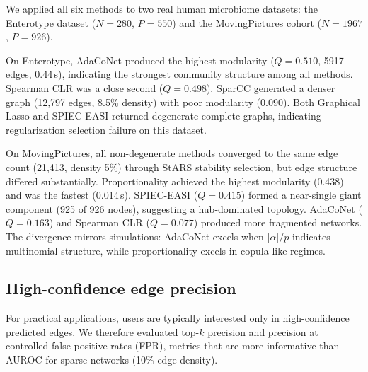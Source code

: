 \documentclass[unnumsec,webpdf,contemporary,large,numbered]{oup-authoring-template}
\theoremstyle{plain}
\theoremstyle{definition}
\begin{document}
We applied all six methods to two real human microbiome datasets: the Enterotype dataset ($N{=}280$, $P{=}550$) and the MovingPictures cohort ($N{=}1967$, $P{=}926$).

On Enterotype, AdaCoNet produced the highest modularity ($Q{=}0.510$, 5917 edges, 0.44\,s), indicating the strongest community structure among all methods. Spearman CLR was a close second ($Q{=}0.498$). SparCC generated a denser graph (12{,}797 edges, 8.5\% density) with poor modularity (0.090). Both Graphical Lasso and SPIEC-EASI returned degenerate complete graphs, indicating regularization selection failure on this dataset.

On MovingPictures, all non-degenerate methods converged to the same edge count (21{,}413, density 5\%) through StARS stability selection, but edge structure differed substantially. Proportionality achieved the highest modularity (0.438) and was the fastest (0.014\,s). SPIEC-EASI ($Q{=}0.415$) formed a near-single giant component (925 of 926 nodes), suggesting a hub-dominated topology. AdaCoNet ($Q{=}0.163$) and Spearman CLR ($Q{=}0.077$) produced more fragmented networks. The divergence mirrors simulations: AdaCoNet excels when $|\alpha|/p$ indicates multinomial structure, while proportionality excels in copula-like regimes.

\subsection{High-confidence edge precision}\label{ssec:topk}

For practical applications, users are typically interested only in high-confidence predicted edges. We therefore evaluated top-$k$ precision and precision at controlled false positive rates (FPR), metrics that are more informative than AUROC for sparse networks (10\% edge density).
\end{document}
